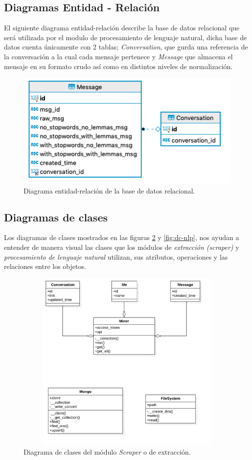     \subsection{Diagramas Entidad - Relación}
    El siguiente diagrama entidad-relación describe la base de datos relacional que será utilizada por el modulo de procesamiento de lenguaje natural, dicha base de datos cuenta únicamente con 2 tablas; \textit{Conversation}, que gurda una referencia de la conversación a la cual cada mensaje pertenece y \textit{Message} que almacena el mensaje en su formato crudo así como en distintos niveles de normalización.
    \begin{figure}[H]
         \centering
         \includegraphics[width=.7\linewidth]{Latex/Classes/Imagenes/ER.png}
         \caption{Diagrama entidad-relación de la base de datos relacional.}
         \label{fig:diagrama-entidad-relacion}
    \end{figure}
    \newpage
        
    \subsection{Diagramas de clases}
        Los diagramas de clases mostrados en las figuras \ref{fig:dc-scraper} y \ref{fig:dc-nlp}, nos ayudan a entender de manera visual las clases que los módulos de \textit{extracción (scraper)} y \textit{procesamiento de lenguaje natural} utilizan, sus atributos, operaciones y las relaciones entre los objetos.
        \begin{figure}[H]
             \centering
             \includegraphics[height=9cm, width=16.5cm]{Latex/Classes/Imagenes/Scraper_Classes.png}
             \caption{Diagrama de clases del módulo \textit{Scraper} o de extracción.}
             \label{fig:dc-scraper}
        \end{figure}

